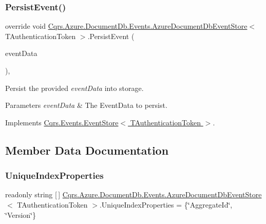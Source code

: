 \subsubsection{\texorpdfstring{Persist\+Event()}{PersistEvent()}}
{\footnotesize\ttfamily override void \hyperlink{classCqrs_1_1Azure_1_1DocumentDb_1_1Events_1_1AzureDocumentDbEventStore}{Cqrs.\+Azure.\+Document\+Db.\+Events.\+Azure\+Document\+Db\+Event\+Store}$<$ T\+Authentication\+Token $>$.Persist\+Event (\begin{DoxyParamCaption}\item[{\hyperlink{classCqrs_1_1Events_1_1EventData}{Event\+Data}}]{event\+Data }\end{DoxyParamCaption})\hspace{0.3cm}{\ttfamily [protected]}, {\ttfamily [virtual]}}



Persist the provided {\itshape event\+Data}  into storage. 


\begin{DoxyParams}{Parameters}
{\em event\+Data} & The Event\+Data to persist.\\
\hline
\end{DoxyParams}


Implements \hyperlink{classCqrs_1_1Events_1_1EventStore_aedb71ca0ddf21220e323bc60ad7508cd_aedb71ca0ddf21220e323bc60ad7508cd}{Cqrs.\+Events.\+Event\+Store$<$ T\+Authentication\+Token $>$}.



\subsection{Member Data Documentation}
\mbox{\label{classCqrs_1_1Azure_1_1DocumentDb_1_1Events_1_1AzureDocumentDbEventStore_ab2a2b5dd046487edc33917983587d847_ab2a2b5dd046487edc33917983587d847}} 
\subsubsection{\texorpdfstring{Unique\+Index\+Properties}{UniqueIndexProperties}}
{\footnotesize\ttfamily readonly string \mbox{[}$\,$\mbox{]} \hyperlink{classCqrs_1_1Azure_1_1DocumentDb_1_1Events_1_1AzureDocumentDbEventStore}{Cqrs.\+Azure.\+Document\+Db.\+Events.\+Azure\+Document\+Db\+Event\+Store}$<$ T\+Authentication\+Token $>$.Unique\+Index\+Properties = \{\char`\"{}Aggregate\+Id\char`\"{}, \char`\"{}Version\char`\"{}\}\hspace{0.3cm}{\ttfamily [protected]}}



